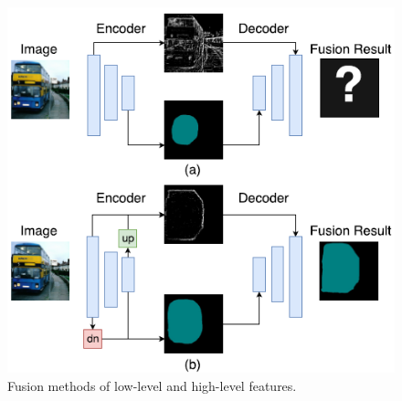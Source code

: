 \documentclass[]{IEEEtran}
\begin{document}

\newpage
\begin{figure}[!hbt]
		\vspace{0.5cm}
		\begin{center}
			\includegraphics[width=\columnwidth]{fw}
			\caption{Fusion methods of low-level and high-level features.}
			\label{fig:fw}

		\end{center}
	\end{figure}

\end{document}
